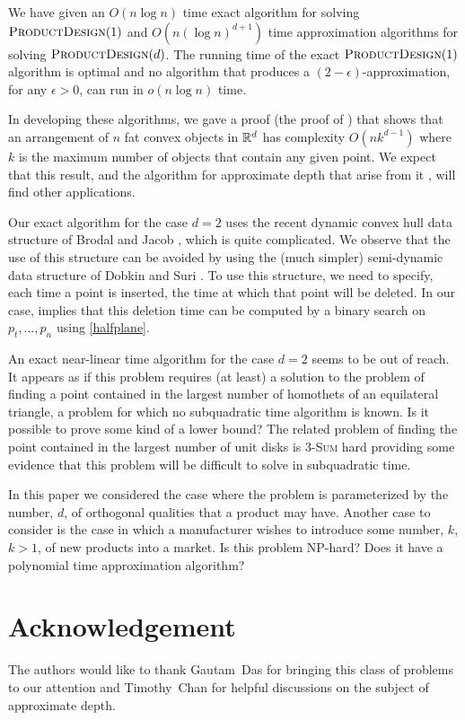 \documentclass[lotsofwhite]{patmorin}
\newcommand{\eps}{\epsilon}
\begin{document}
We have given an $O(n\log n)$ time exact algorithm for solving
$\textsc{ProductDesign}(1)$ and $O(n(\log n)^{d+1})$ time approximation
algorithms for solving $\textsc{ProductDesign}(d)$.  The running time of
the exact $\textsc{ProductDesign}(1)$ algorithm is optimal and no algorithm
that produces a $(2-\eps)$-approximation, for any $\epsilon > 0$, can run
in $o(n\log n)$ time.  

In developing these algorithms, we gave a proof (the
proof of ) that shows that an arrangement of $n$ fat convex
objects in $\mathbb{R}^d$ has complexity $O(nk^{d-1})$ where $k$ is the maximum
number of objects that contain any given point. We expect that this result,
and the algorithm for approximate depth that arise from it \cite{ah08},
will find other applications.

Our exact algorithm for the case $d=2$ uses the recent dynamic convex
hull data structure of Brodal and Jacob \cite{bj02}, which is quite
complicated.  We observe that the use of this structure can be avoided
by using the (much simpler) semi-dynamic data structure of Dobkin and Suri
\cite{ds91}.  To use this structure, we need to specify, each time a point is
inserted, the time at which that point will be deleted.  In our case,
 implies that this deletion time can be computed by a
binary search on $p_t,\ldots,p_n$ using \eqref{halfplane}.

An exact near-linear time algorithm for the case $d=2$ seems to be out of
reach.  It appears as if this problem requires (at least) a solution to the
problem of finding a point contained in the largest number of homothets of
an equilateral triangle, a problem for which no subquadratic time algorithm
is known.  Is it possible to prove some kind of a lower bound?  The related
problem of finding the point contained in the largest number of unit disks
is \textsc{3-Sum} hard \cite{ah08} providing some evidence that this
problem will be difficult to solve in subquadratic time.

In this paper we considered the case where the problem is parameterized by
the number, $d$, of orthogonal qualities that a product may have.  Another
case to consider is the case in which a manufacturer wishes to introduce
some number, $k$, $k>1$, of new products into a market.   Is this problem
NP-hard?  Does it have a polynomial time approximation algorithm?


\section*{Acknowledgement}

The authors would like to thank Gautam~Das for bringing this class of
problems to our attention and Timothy~Chan for helpful discussions on
the subject of approximate depth.



\end{document}
